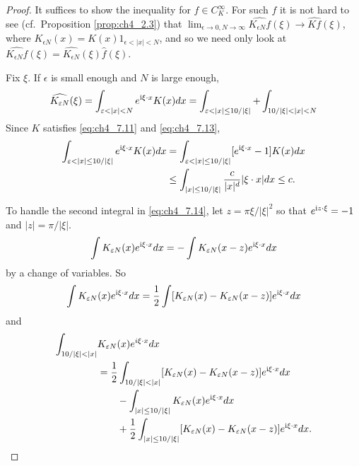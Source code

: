 \begin{proof}
It suffices to show the inequality for $f \in C_K^\infty$. For such $f$ it is not hard to see (cf.\ Proposition \ref{prop:ch4_2.3}) that $\lim_{\epsilon\to 0,N\to\infty}\widehat{K_{\epsilon N}f}(\xi) \to \widehat{Kf}(\xi)$, where $K_{\epsilon N}(x) = K(x)1_{\epsilon<|x|<N}$, and so we need only look at $\widehat{K_{\epsilon N}f}(\xi) = \widehat{K_{\epsilon N}}(\xi)\widehat{f}(\xi)$.

Fix $\xi$. If $\epsilon$ is small enough and $N$ is large enough,
\begin{equation}\label{eq:ch4_7.14}
    \widehat{K_{\epsilon N}}(\xi) = \int_{\epsilon<|x|<N} e^{\im\xi\cdot x}K(x)dx = \int_{\epsilon<|x|\leq 10/|\xi|} + \int_{10/|\xi|<|x|<N}
\end{equation}
Since $K$ satisfies \eqref{eq:ch4_7.11} and \eqref{eq:ch4_7.13},
\begin{align}\label{eq:ch4_7.15}
    \int_{\epsilon<|x|\leq 10/|\xi|} e^{\im\xi\cdot x}K(x)dx &= \int_{\epsilon<|x|\leq 10/|\xi|} [e^{\im\xi\cdot x} - 1]K(x)dx \\
    &\leq \int_{|x|\leq 10/|\xi|} \frac{c}{|x|^d}|\xi\cdot x|dx \leq c. \notag
\end{align}

\mpagebreak

To handle the second integral in \eqref{eq:ch4_7.14}, let $z = \pi\xi/|\xi|^2$ so that $e^{\mathrm{i} z\cdot\xi} = -1$ and $|z| = \pi/|\xi|$.
\begin{equation}\label{eq:ch4_7.16}
    \int K_{\varepsilon N}(x)e^{\mathrm{i}\xi\cdot x}dx = -\int K_{\varepsilon N}(x-z)e^{\mathrm{i}\xi\cdot x}dx
\end{equation}
by a change of variables. So
\[
    \int K_{\varepsilon N}(x)e^{\mathrm{i}\xi\cdot x}dx = \frac{1}{2}\int[K_{\varepsilon N}(x) - K_{\varepsilon N}(x-z)]e^{\mathrm{i}\xi\cdot x}dx
\]
and
\begin{align}\label{eq:ch4_7.17}
    \int_{10/|\xi|<|x|} &K_{\epsilon N}(x)e^{i\xi\cdot x}dx \\
    &= \frac{1}{2}\int_{10/|\xi|<|x|}[K_{\epsilon N}(x) - K_{\epsilon N}(x-z)]e^{\im\xi\cdot x}dx \notag \\
    &\qquad-\int_{|x|\leq 10/|\xi|} K_{\epsilon N}(x)e^{\im\xi\cdot x}dx \notag \\
    &\qquad+\frac{1}{2}\int_{|x|\leq 10/|\xi|}[K_{\epsilon N}(x) - K_{\epsilon N}(x-z)]e^{\im\xi\cdot x}dx. \notag
\end{align}


\end{proof}
